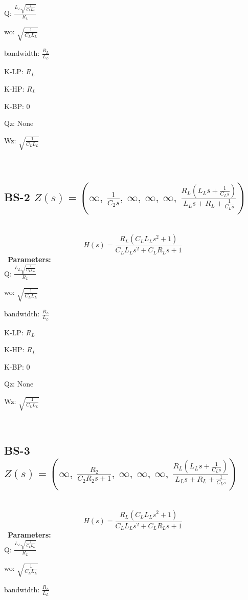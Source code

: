 \documentclass{article}
\begin{document}
Q: $\frac{L_{L} \sqrt{\frac{1}{C_{L} L_{L}}}}{R_{L}}$\ 

wo: $\sqrt{\frac{1}{C_{L} L_{L}}}$\ 

bandwidth: $\frac{R_{L}}{L_{L}}$\ 

K-LP: $R_{L}$\ 

K-HP: $R_{L}$\ 

K-BP: $0$\ 

Qz: $\text{None}$\ 

Wz: $\sqrt{\frac{1}{C_{L} L_{L}}}$\ 

\ 

\subsection{BS-2 $Z(s) = \left( \infty, \  \frac{1}{C_{2} s}, \  \infty, \  \infty, \  \infty, \  \frac{R_{L} \left(L_{L} s + \frac{1}{C_{L} s}\right)}{L_{L} s + R_{L} + \frac{1}{C_{L} s}}\right)$ } \ 
\textbf{\[H(s) = \frac{R_{L} \left(C_{L} L_{L} s^{2} + 1\right)}{C_{L} L_{L} s^{2} + C_{L} R_{L} s + 1}\] } \ 
\textbf{Parameters:}\\ 

Q: $\frac{L_{L} \sqrt{\frac{1}{C_{L} L_{L}}}}{R_{L}}$\ 

wo: $\sqrt{\frac{1}{C_{L} L_{L}}}$\ 

bandwidth: $\frac{R_{L}}{L_{L}}$\ 

K-LP: $R_{L}$\ 

K-HP: $R_{L}$\ 

K-BP: $0$\ 

Qz: $\text{None}$\ 

Wz: $\sqrt{\frac{1}{C_{L} L_{L}}}$\ 

\ 

\subsection{BS-3 $Z(s) = \left( \infty, \  \frac{R_{2}}{C_{2} R_{2} s + 1}, \  \infty, \  \infty, \  \infty, \  \frac{R_{L} \left(L_{L} s + \frac{1}{C_{L} s}\right)}{L_{L} s + R_{L} + \frac{1}{C_{L} s}}\right)$ } \ 
\textbf{\[H(s) = \frac{R_{L} \left(C_{L} L_{L} s^{2} + 1\right)}{C_{L} L_{L} s^{2} + C_{L} R_{L} s + 1}\] } \ 
\textbf{Parameters:}\\ 

Q: $\frac{L_{L} \sqrt{\frac{1}{C_{L} L_{L}}}}{R_{L}}$\ 

wo: $\sqrt{\frac{1}{C_{L} L_{L}}}$\ 

bandwidth: $\frac{R_{L}}{L_{L}}$\ 
\end{document}
